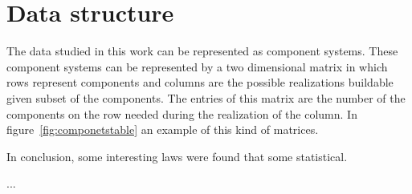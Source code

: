 \chapter{Data structure}\label{ch:structure}

The data studied in this work can be represented as component systems. These component systems can be represented by a two dimensional matrix in which rows represent components and columns are the possible realizations buildable given subset of the components. The entries of this matrix are the number of the components on the row needed during the realization of the column. In figure~\ref{fig:componetstable} an example of this kind of matrices.

\cite{mazzolini2018heaps}
\cite{Mazzolini2018zipf}
\cite{altmann2016statistical}









In conclusion, some interesting laws were found that some statistical.

...